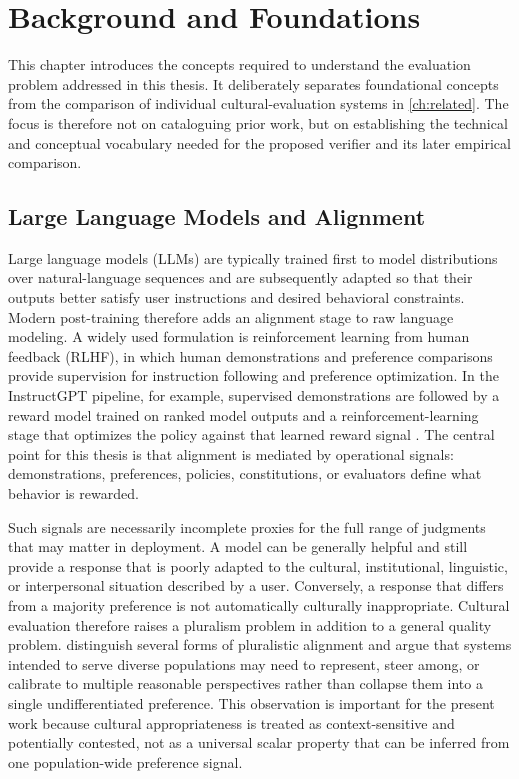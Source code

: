 \chapter{Background and Foundations}
\label{ch:background}

This chapter introduces the concepts required to understand the evaluation problem addressed in this thesis. It deliberately separates foundational concepts from the comparison of individual cultural-evaluation systems in \cref{ch:related}. The focus is therefore not on cataloguing prior work, but on establishing the technical and conceptual vocabulary needed for the proposed verifier and its later empirical comparison.

\section{Large Language Models and Alignment}

Large language models (LLMs) are typically trained first to model distributions over natural-language sequences and are subsequently adapted so that their outputs better satisfy user instructions and desired behavioral constraints. Modern post-training therefore adds an alignment stage to raw language modeling. A widely used formulation is reinforcement learning from human feedback (RLHF), in which human demonstrations and preference comparisons provide supervision for instruction following and preference optimization. In the InstructGPT pipeline, for example, supervised demonstrations are followed by a reward model trained on ranked model outputs and a reinforcement-learning stage that optimizes the policy against that learned reward signal \parencite{ouyang2022instructgpt}. The central point for this thesis is that alignment is mediated by operational signals: demonstrations, preferences, policies, constitutions, or evaluators define what behavior is rewarded.

Such signals are necessarily incomplete proxies for the full range of judgments that may matter in deployment. A model can be generally helpful and still provide a response that is poorly adapted to the cultural, institutional, linguistic, or interpersonal situation described by a user. Conversely, a response that differs from a majority preference is not automatically culturally inappropriate. Cultural evaluation therefore raises a pluralism problem in addition to a general quality problem. \textcite{sorensen2024pluralistic} distinguish several forms of pluralistic alignment and argue that systems intended to serve diverse populations may need to represent, steer among, or calibrate to multiple reasonable perspectives rather than collapse them into a single undifferentiated preference. This observation is important for the present work because cultural appropriateness is treated as context-sensitive and potentially contested, not as a universal scalar property that can be inferred from one population-wide preference signal.

